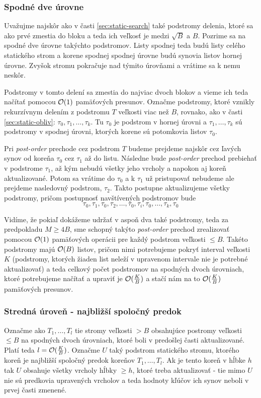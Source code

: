\subsubsection{Spodné dve úrovne}
Uvažujme najskôr ako v časti \ref{sec:static-search} také podstromy \vEB delenia, ktoré sa ako prvé zmestia do bloku \cache a teda ich veľkosť je medzi $\sqrt{B}$ a $B$. Pozrime sa na spodné dve úrovne takýchto podstromov. Listy spodnej teda budú listy celého statického strom a korene spodnej spodnej úrovne budú synovia listov hornej úrovne. Zvyšok stromu pokračuje nad týmito úrovňami a vrátime sa k nemu neskôr.

Podstromy v tomto delení sa zmestia do najviac dvoch blokov a vieme ich teda načítať pomocou $\mathcal{O}(1)$ pamäťových presunov. Označme podstromy, ktoré vznikly rekurzívnym \vEB delením z podstromu $T$ veľkosti viac než $B$, rovnako, ako v časti \ref{sec:static-obliv}: $\tau_0, \tau_1, \dotsc, \tau_k$. Tu $\tau_0$ je podstrom v hornej úrovni a $\tau_1,\dotsc,\tau_k$ sú podstromy v spodnej úrovni, ktorých korene sú potomkovia listov $\tau_0$.

Pri \emph{post-order} prechode cez podstrom $T$ budeme prejdeme najskôr cez ľavých synov od koreňa $\tau_0$ cez $\tau_1$ až do listu. Následne bude \emph{post-order} prechod prebiehať v podstrome $\tau_1$, až kým nebudú všetky jeho vrcholy a napokon aj koreň aktualizované. Potom sa vrátime do $\tau_0$ a k $\tau_1$ už pristupovať nebudeme ale prejdeme nasledovný podstrom, $\tau_2$. Takto postupne aktualizujeme všetky podstromy, pričom postupnosť navštívených podstromov bude
\[
\tau_0, \tau_1, \tau_0, \tau_2, \dotsc, \tau_0, \tau_i, \tau_0, \dotsc, \tau_k, \tau_0
\]

Vidíme, že pokiaľ dokážeme udržať v \cache aspoň dva také podstromy, teda za predpokladu $M \ge 4B$, sme schopný takýto \emph{post-order} prechod zrealizovať pomocou $\mathcal{O}(1)$ pamäťových operácii pre každý podstrom veľkosti $\le B$. Takéto podstromy majú $\mathcal{O}(B)$ listov, pričom  nimi potrebujeme pokryť interval veľkosti $K$ (podstromy, ktorých žiaden list neleží v upravenom intervale nie je potrebné aktualizovať) a teda celkový počet podstromov na spodných dvoch úrovniach, ktoré potrebujeme načítať a upraviť je $\mathcal{O}(\frac{K}{B})$ a stačí nám na to $\mathcal{O}(\frac{K}{B})$ pamäťových presunov.

\subsubsection{Stredná úroveň - najbližší spoločný predok}
Označme ako $T_1,\dotsc,T_l$ tie stromy veľkosti $>B$ obsahujúce postromy veľkosti $\le B$ na spodných dvoch úrovniach, ktoré boli v predošlej časti aktualizované. Platí teda $l = \mathcal{O}(\frac{K}{B})$. Označme $U$ taký podstrom statického stromu, ktorého koreň je najbližší spoločný predok koreňov $T_1,\dotsc,T_l$. Ak je tento koreň v hĺbke $h$ tak $U$ obsahuje všetky vrcholy hĺbky $\ge h$, ktoré treba aktualizovať - tie mimo $U$ nie sú predkovia upravených vrcholov a teda hodnoty kľúčov ich synov neboli v prvej časti zmenené.

